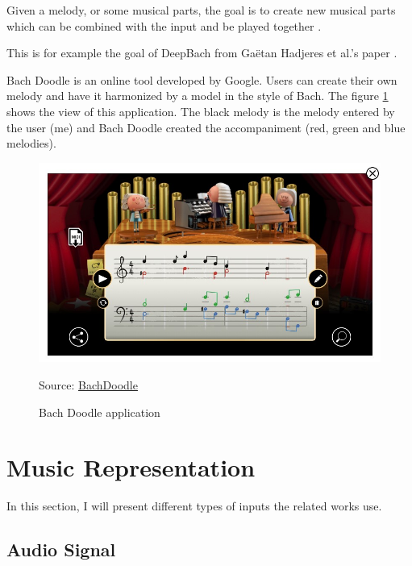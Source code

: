 \documentclass[12pt]{report}
\begin{document}
Given a melody, or some musical parts, the goal is to create new musical parts which can be combined with the input and be played together \cite{hadjeres_deepbach:_2016, huang_bach_2019}.

This is for example the goal of DeepBach from Gaëtan Hadjeres et al.'s paper \cite{hadjeres_deepbach:_2016}.

Bach Doodle \cite{huang_bach_2019} is an online tool developed by Google.
Users can create their own melody and have it harmonized by a model in the style of Bach.
The figure \ref{fig:bachdoodle} shows the view of this application.
The black melody is the melody entered by the user (me) and Bach Doodle created the accompaniment (red, green and blue melodies).

\begin{figure}[htbp]
    \centering
    \includegraphics[width=\textwidth]{images/related_works/bachdooldle/bachdoodle.jpg}
    \caption{Bach Doodle application}
    Source: \href{https://www.google.com/doodles/celebrating-johann-sebastian-bach}{BachDoodle}
    \label{fig:bachdoodle}
\end{figure}


\section{Music Representation}
\label{sec:related-works:music-representation}

In this section, I will present different types of inputs the related works use.

\subsection{Audio Signal} 
\end{document}
